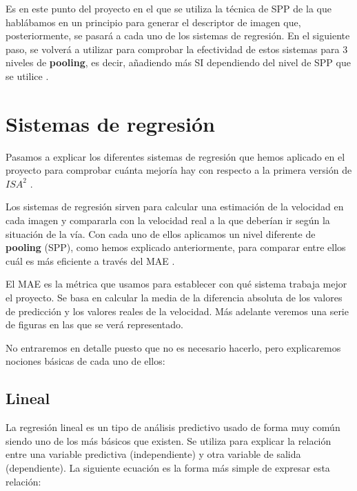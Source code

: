 Es en este punto del proyecto en el que se utiliza la técnica de \ac{SPP} \cite{spp} de la que hablábamos en un principio para generar el descriptor de imagen que, posteriormente, se pasará a cada uno de los sistemas de regresión. En el siguiente paso, se volverá a utilizar para comprobar la efectividad de estos sistemas para 3 niveles de \textbf{pooling}, es decir, añadiendo más \ac{SI} dependiendo del nivel de \ac{SPP} que se utilice \cite{isa2}.

\section{Sistemas de regresión}

Pasamos a explicar los diferentes sistemas de regresión que hemos aplicado en el proyecto para comprobar cuánta mejoría hay con respecto a la primera versión de $ISA^{2}$ \cite{isa2}.

Los sistemas de regresión sirven para calcular una estimación de la velocidad en cada imagen y compararla con la velocidad real a la que deberían ir según la situación de la vía. Con cada uno de ellos aplicamos un nivel diferente de \textbf{pooling} (\ac{SPP}), como hemos explicado anteriormente, para comparar entre ellos cuál es más eficiente a través del \ac{MAE} \cite{mae}.
 
El \ac{MAE} es la métrica que usamos para establecer con qué sistema trabaja mejor el proyecto. Se basa en calcular la media de la diferencia absoluta de los valores de predicción y los valores reales de la velocidad. Más adelante veremos una serie de figuras en las que se verá representado.

No entraremos en detalle puesto que no es necesario hacerlo, pero explicaremos nociones básicas de cada uno de ellos:

\subsection{Lineal}

La regresión lineal \cite{linear} es un tipo de análisis predictivo usado de forma muy común siendo uno de los más básicos que existen. Se utiliza para explicar la relación entre una variable predictiva (independiente) y otra variable de salida (dependiente). La siguiente ecuación es la forma más simple de expresar esta relación:

